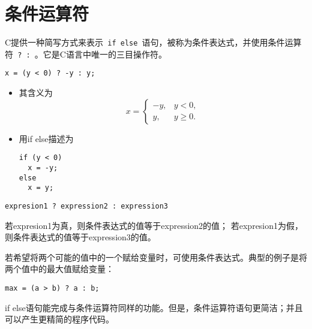 \section{条件运算符}
\begin{frame}[fragile]\ft{\secname}
C提供一种简写方式来表示\lstinline| if else |语句，被称为条件表达式，并使用条件运算符\lstinline| ? : |。它是C语言中唯一的三目操作符。
\end{frame}

\begin{frame}[fragile]\ft{\secname}
\begin{lstlisting}[title=求绝对值]
x = (y < 0) ? -y : y;
\end{lstlisting}

\pause \vspace{.1in}

\begin{itemize}
\item 其含义为
$$
x = \left\{
\begin{array}{ll}
-y, & y < 0, \\
y, & y \ge 0.
\end{array}
\right.
$$
\item 用if else描述为
\begin{lstlisting}
if (y < 0)
  x = -y;
else
  x = y;  
\end{lstlisting}
\end{itemize}
\end{frame}

\begin{frame}[fragile]\ft{\secname}
\begin{lstlisting}[title=条件表达式的语法]
expresion1 ? expression2 : expression3
\end{lstlisting}

\pause \vspace{.1in}

若expresion1为真，则条件表达式的值等于expression2的值；
若expresion1为假，则条件表达式的值等于expression3的值。
\end{frame}

\begin{frame}[fragile]\ft{\secname}
若希望将两个可能的值中的一个赋给变量时，可使用条件表达式。典型的例子是将两个值中的最大值赋给变量：
\begin{lstlisting}[frame=single]
max = (a > b) ? a : b;
\end{lstlisting}
\end{frame}

\begin{frame}[fragile]\ft{\secname}
if else语句能完成与条件运算符同样的功能。但是，条件运算符语句更简洁；并且可以产生更精简的程序代码。
\end{frame}

